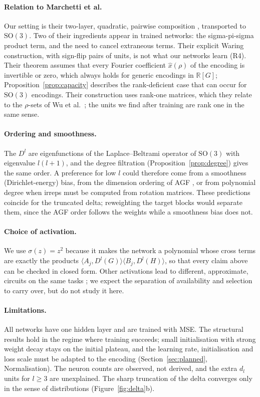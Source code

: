 \documentclass[a4paper,11pt]{article}
\theoremstyle{remark}
\theoremstyle{definition}
\newcommand{\R}{\mathbb{R}}
\newcommand{\SO}{\mathrm{SO}(3)}
\newcommand{\ip}[2]{\langle #1, #2 \rangle}
\begin{document}
\paragraph{Relation to Marchetti et al.} Our setting is their two-layer,
quadratic, pairwise composition \cite{marchetti2026sequential}, transported to
$\SO$. Two of their ingredients appear in trained networks: the sigma-pi-sigma
product term, and the need to cancel extraneous terms. Their explicit Waring
construction, with sign-flip pairs of units, is not what our networks learn (R4).
Their theorem assumes that every Fourier coefficient $\hat x(\rho)$ of the encoding
is invertible or zero, which always holds for generic encodings in $\R[G]$;
Proposition~\ref{prop:capacity} describes the rank-deficient case that can occur
for $\SO$ encodings. Their construction uses rank-one matrices, which they relate
to the $\rho$-sets of Wu et al.\ \cite{wu2024unifying}; the units we find after
training are rank one in the same sense.

\paragraph{Ordering and smoothness.} The $D^l$ are eigenfunctions of the
Laplace--Beltrami operator of $\SO$ with eigenvalue $l(l+1)$, and the degree
filtration (Proposition~\ref{prop:degree}) gives the same order. A preference for
low $l$ could therefore come from a smoothness (Dirichlet-energy) bias, from the
dimension ordering of AGF \cite{marchetti2026sequential}, or from polynomial
degree when irreps must be computed from rotation matrices. These predictions
coincide for the truncated delta; reweighting the target blocks would separate
them, since the AGF order follows the weights while a smoothness bias does not.

\paragraph{Choice of activation.} We use $\sigma(z)=z^2$ because it makes the
network a polynomial whose cross terms are exactly the products
$\ip{A_j}{D^l(G)}\ip{B_j}{D^l(H)}$, so that every claim above can be checked in
closed form. Other activations lead to different, approximate, circuits on the
same tasks \cite{zhong2023clock, nanda2023progress}; we expect the separation of
availability and selection to carry over, but do not study it here.

\paragraph{Limitations.} All networks have one hidden layer and are trained with
MSE. The structural results hold in the regime where training succeeds; small
initialisation with strong weight decay stays on the initial plateau, and the
learning rate, initialisation and loss scale must be adapted to the encoding
(Section~\ref{sec:planned}, Normalisation). The neuron counts are observed, not
derived, and the extra $d_l$ units for $l\ge3$ are unexplained. The sharp
truncation of the delta converges only in the sense of distributions
(Figure~\ref{fig:delta}b).
\end{document}
